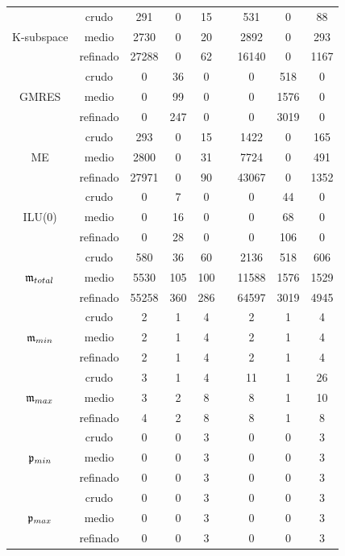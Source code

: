 \begin{table}[htb]
\begin{adjustbox}{width=0.8\columnwidth,center}
\begin{tabular}{ ccccccccc }
		\hline
		& crudo & 291 & 0 & 15  & & 531 & 0 & 88 \\
		K-subspace  & medio & 2730 & 0 & 20  & & 2892 & 0 & 293 \\
		& refinado & 27288 & 0 & 62  & & 16140 & 0 & 1167 \\
		\hline
		& crudo & 0 & 36 & 0 &  & 0 & 518 & 0 \\
		GMRES  & medio & 0 & 99 & 0 &  & 0 & 1576 & 0 \\
		& refinado & 0 & 247 & 0 & &  0 & 3019 & 0 \\
		\hline
		& crudo & 293 & 0 & 15  & & 1422 & 0 & 165 \\
		ME  & medio & 2800 & 0 & 31 &  & 7724 & 0 & 491 \\
		& refinado & 27971 & 0 & 90  & & 43067 & 0 & 1352 \\
		\hline
		& crudo & 0 & 7 & 0  & & 0 & 44 & 0 \\
		ILU(0)  & medio & 0 & 16 & 0  & & 0 & 68 & 0 \\
		& refinado & 0 & 28 & 0  & & 0 & 106 & 0  \\
		\hline
		& crudo & 580 & 36 & 60  & & 2136 & 518 & 606 \\
		$\mathfrak{m}_{total}$  & medio & 5530 & 105 & 100 &  & 11588 & 1576 & 1529 \\
		& refinado & 55258 & 360 & 286  & & 64597 & 3019 & 4945 \\
		\hline
		& crudo & 2 & 1 & 4  & & 2 & 1 & 4 \\
		$\mathfrak{m}_{min}$  & medio & 2 & 1 & 4  & & 2 & 1 & 4 \\
		& refinado & 2 & 1 & 4 & &  2 & 1 & 4 \\
		\hline
		& crudo & 3 & 1 & 4 & &  11 & 1 & 26 \\
		$\mathfrak{m}_{max}$  & medio & 3 & 2 & 8  & & 8 & 1 & 10  \\
		& refinado & 4 & 2 & 8  & & 8 & 1 & 8 \\
		\hline
		& crudo & 0 & 0 & 3  & & 0 & 0 & 3 \\
		$\mathfrak{p}_{min}$  & medio & 0 & 0 & 3  & & 0 & 0 & 3 \\
		& refinado & 0 & 0 & 3  & & 0 & 0 & 3 \\
		\hline
		& crudo & 0 & 0 & 3 &  & 0 & 0 & 3 \\
		$\mathfrak{p}_{max}$  & medio & 0 & 0 & 3  & & 0 & 0 & 3  \\
		& refinado & 0 & 0 & 3 &  & 0 & 0 & 3 \\
		\hline
	\end{tabular}
	\end{adjustbox}
\end{table}


